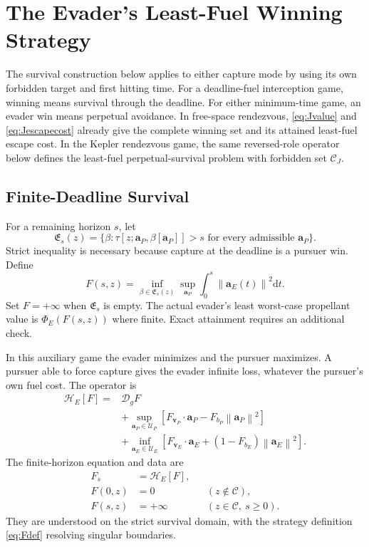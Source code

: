 \documentclass[journal,a4paper]{IEEEtran}
\newcommand{\C}{\mathcal C}
\newcommand{\U}{\mathcal U}
\newcommand{\D}{\mathcal D}
\newcommand{\HH}{\mathcal H}
\newcommand{\norm}[1]{\left\|#1\right\|}
\newcommand{\dd}{\mathrm d}
\begin{document}
\section{The Evader's Least-Fuel Winning Strategy}
\label{sec:escape}
The survival construction below applies to either capture mode by using its own forbidden target and first hitting time. For a deadline-fuel interception game, winning means survival through the deadline. For either minimum-time game, an evader win means perpetual avoidance. In free-space rendezvous, \eqref{eq:Jvalue} and \eqref{eq:Jescapecost} already give the complete winning set and its attained least-fuel escape cost. In the Kepler rendezvous game, the same reversed-role operator below defines the least-fuel perpetual-survival problem with forbidden set $\C_J$.
\subsection{Finite-Deadline Survival}
For a remaining horizon $s$, let
\begin{equation}
 \mathfrak E_s(z)=
 \{\beta:\tau[z;\mathbf a_P,\beta[\mathbf a_P]]>s
                  \text{ for every admissible }\mathbf a_P\}.
 \label{eq:winningE}
\end{equation}
Strict inequality is necessary because capture at the deadline is a pursuer win. Define
\begin{equation}
 F(s,z)=\inf_{\beta\in\mathfrak E_s(z)}
       \sup_{\mathbf a_P}\int_0^s\norm{\mathbf a_E(t)}^2\dd t.
 \label{eq:Fdef}
\end{equation}
Set $F=+\infty$ when $\mathfrak E_s$ is empty. The actual evader's least worst-case propellant value is $\Phi_E(F(s,z))$ where finite. Exact attainment requires an additional check.

In this auxiliary game the evader minimizes and the pursuer maximizes. A pursuer able to force capture gives the evader infinite loss, whatever the pursuer's own fuel cost. The operator is
\begin{align}
 \HH_E[F]={}&\D_g F\nonumber\\
 &+\sup_{\mathbf a_P\in\U_P}
  [F_{\mathbf v_P}\cdot\mathbf a_P-F_{b_P}\norm{\mathbf a_P}^2]\nonumber\\
 &+\inf_{\mathbf a_E\in\U_E}
  [F_{\mathbf v_E}\cdot\mathbf a_E+(1-F_{b_E})\norm{\mathbf a_E}^2].
 \label{eq:HE}
\end{align}
The finite-horizon equation and data are
\begin{align}
 F_s&=\HH_E[F],\label{eq:FPDE}\\
 F(0,z)&=0 &&(z\notin\C),\nonumber\\
 F(s,z)&=+\infty &&(z\in\C,\ s\ge0).\label{eq:Fbc}
\end{align}
They are understood on the strict survival domain, with the strategy definition \eqref{eq:Fdef} resolving singular boundaries.
\end{document}
